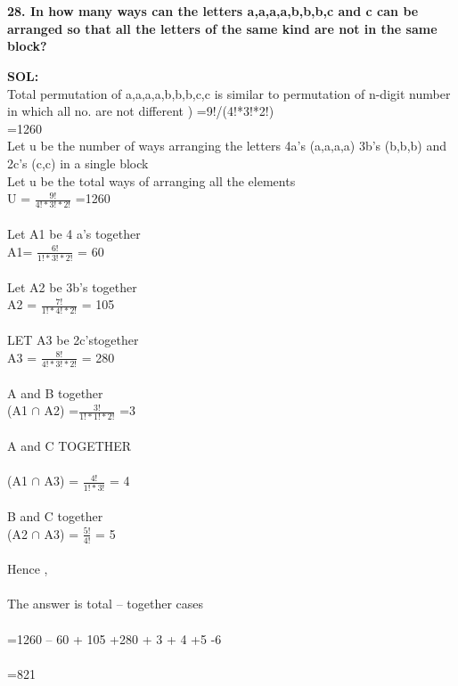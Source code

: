 \documentclass[8pt,a4paper]{article}
\begin{document}
\section{}

\textbf{28. In how many ways can the letters a,a,a,a,b,b,b,c and c can be arranged so that all the
letters of the same kind are not in the same block?}

\textbf{SOL:}\\Total permutation of a,a,a,a,b,b,b,c,c is similar to permutation of n-digit number in which all no. are not different ) =9!/(4!*3!*2!)\\
=1260\\
Let u be the number of ways arranging the letters  4a’s (a,a,a,a)  3b’s (b,b,b) and 2c’s (c,c) in a single block \\
Let u be the total ways of arranging all the elements\\  
U  = $\frac{9!}{4!*3!*2!}$  =1260\\
\\
Let A1 be 4 a’s together \\
A1= $\frac{6!}{1!*3!*2!}$ = 60\\
\\
Let A2 be 3b’s together\\
A2 = $\frac{7!}{1!*4!*2!}$  = 105\\
\\
LET A3 be 2c’stogether\\
A3 = $\frac{8!}{4!*3!*2!}$  = 280\\
\\
A  and B together \\
(A1 $\cap$ A2) =$\frac{3!}{1!*1!*2!}$ =3\\
\\
A and C TOGETHER \\
\\
(A1 $\cap$ A3) = $\frac{4!}{1!*3!}$ = 4\\
\\  
B and C together \\
(A2 $\cap$ A3) = $\frac{5!}{4!}$ = 5\\
\\
Hence ,\\
\\
The answer is total – together cases\\
\\
=1260 – {60 + 105 +280} + 3 + 4 +5 -6\\
\\ 
=821\\
\end{document}

